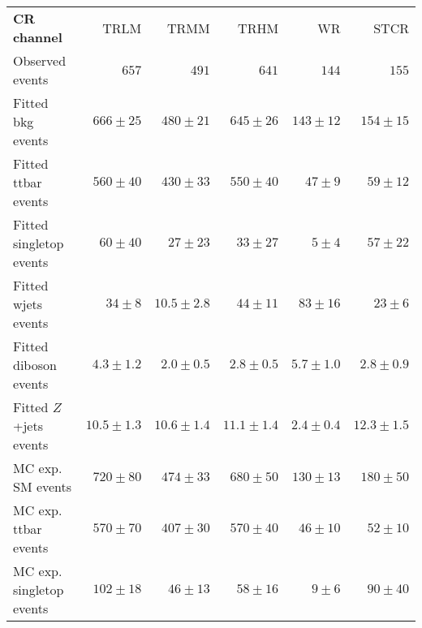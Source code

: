 

\begin{table}
\begin{center}
\setlength{\tabcolsep}{0.0pc}
{\small
\begin{tabular*}{\textwidth}{@{\extracolsep{\fill}}lrrrrr}
\noalign{\smallskip}\hline\noalign{\smallskip}
{\textbf{ CR channel}}           & TRLM            & TRMM            & TRHM            & WR            & STCR              \\[-0.05cm]
\noalign{\smallskip}\hline\noalign{\smallskip}
Observed events          & $657$              & $491$              & $641$              & $144$              & $155$                    \\
\noalign{\smallskip}\hline\noalign{\smallskip}
Fitted bkg events         & $666 \pm 25$          & $480 \pm 21$          & $645 \pm 26$          & $143 \pm 12$          & $154 \pm 15$              \\
\noalign{\smallskip}\hline\noalign{\smallskip}
        Fitted ttbar events         & $560 \pm 40$          & $430 \pm 33$          & $550 \pm 40$          & $47 \pm 9$          & $59 \pm 12$              \\
        Fitted singletop events         & $60 \pm 40$          & $27 \pm 23$          & $33 \pm 27$          & $5 \pm 4$          & $57 \pm 22$              \\
        Fitted wjets events         & $34 \pm 8$          & $10.5 \pm 2.8$          & $44 \pm 11$          & $83 \pm 16$          & $23 \pm 6$              \\
        Fitted diboson events         & $4.3 \pm 1.2$          & $2.0 \pm 0.5$          & $2.8 \pm 0.5$          & $5.7 \pm 1.0$          & $2.8 \pm 0.9$              \\
        Fitted $Z$+jets events         & $10.5 \pm 1.3$          & $10.6 \pm 1.4$          & $11.1 \pm 1.4$          & $2.4 \pm 0.4$          & $12.3 \pm 1.5$              \\
 \noalign{\smallskip}\hline\noalign{\smallskip}
MC exp. SM events              & $720 \pm 80$          & $474 \pm 33$          & $680 \pm 50$          & $130 \pm 13$          & $180 \pm 50$              \\
\noalign{\smallskip}\hline\noalign{\smallskip}
        MC exp. ttbar events         & $570 \pm 70$          & $407 \pm 30$          & $570 \pm 40$          & $46 \pm 10$          & $52 \pm 10$              \\
        MC exp. singletop events         & $102 \pm 18$          & $46 \pm 13$          & $58 \pm 16$          & $9 \pm 6$          & $90 \pm 40$              \\

\end{tabular*}}
\end{center}
\end{table}
